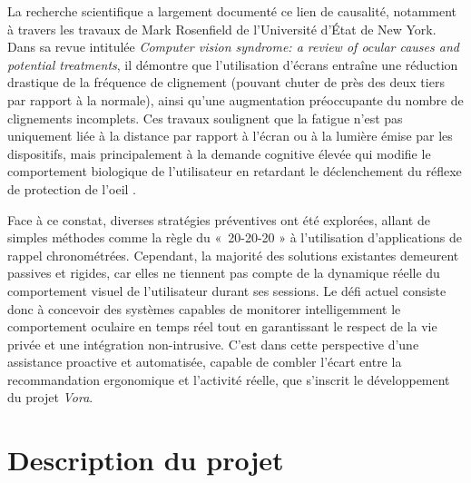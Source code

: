 \documentclass{rapportbrebeuf}
\begin{document}
La recherche scientifique a largement documenté ce lien de causalité, notamment à travers les travaux de Mark Rosenfield de l'Université d'État de New York. Dans sa revue intitulée \textit{Computer vision syndrome: a review of ocular causes and potential treatments}, il démontre que l'utilisation d'écrans entraîne une réduction drastique de la fréquence de clignement (pouvant chuter de près des deux tiers par rapport à la normale), ainsi qu'une augmentation préoccupante du nombre de clignements incomplets. Ces travaux soulignent que la fatigue n'est pas uniquement liée à la distance par rapport à l'écran ou à la lumière émise par les dispositifs, mais principalement à la demande cognitive élevée qui modifie le comportement biologique de l'utilisateur en retardant le déclenchement du réflexe de protection de l'oeil \cite{rosenfield2011syndrome}.

Face à ce constat, diverses stratégies préventives ont été explorées, allant de simples méthodes comme la règle du « 20-20-20 » à l'utilisation d'applications de rappel chronométrées. Cependant, la majorité des solutions existantes demeurent passives et rigides, car elles ne tiennent pas compte de la dynamique réelle du comportement visuel de l'utilisateur durant ses sessions. Le défi actuel consiste donc à concevoir des systèmes capables de monitorer intelligemment le comportement oculaire en temps réel tout en garantissant le respect de la vie privée et une intégration non-intrusive. C'est dans cette perspective d'une assistance proactive et automatisée, capable de combler l'écart entre la recommandation ergonomique et l'activité réelle, que s'inscrit le développement du projet \textit{Vora}.

\newpage
\section{Description du projet}
\end{document}
